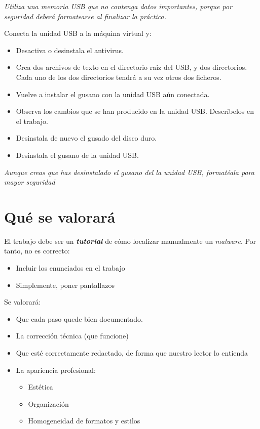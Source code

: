 \begin{homeworkProblem}
\textit{Utiliza una memoria USB que no contenga datos importantes, porque por seguridad deberá formatearse al finalizar la práctica.}

Conecta la unidad USB a la máquina virtual y:
\begin{itemize}
\item Desactiva o desinstala el antivirus.  
\item Crea dos archivos de texto en el directorio raiz del USB, y dos directorios. Cada uno de los dos directorios tendrá a su vez otros dos ficheros.
\item Vuelve a instalar el gusano con la unidad USB aún conectada.
\item Observa los cambios que se han producido en la unidad USB. Descríbelos en el trabajo.
\item Desinstala de nuevo el gusado del disco duro.
\item Desinstala el gusano de la unidad USB.
\end{itemize}

\textit{Aunque creas que has desinstalado el gusano del la unidad USB, formatéala para mayor seguridad}
\end{homeworkProblem}

\section{Qué se valorará}
El trabajo debe ser un \textit{\textbf{tutorial}} de cómo localizar manualmente un \textit{malware}. Por tanto, no es correcto:
\begin{itemize}
\item Incluir los enunciados en el trabajo
\item Simplemente, poner pantallazos
\end{itemize}


Se valorará:
\begin{itemize}
\item Que cada paso quede bien documentado. 
\item La corrección técnica (que funcione)
\item Que esté correctamente redactado, de forma que nuestro lector lo entienda 
\item La apariencia profesional:
  \begin{itemize}
  \item Estética
  \item Organización
  \item Homogeneidad de formatos y estilos
  \end{itemize}
\end{itemize}

